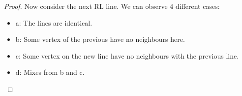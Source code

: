 \documentclass[12pt]{article}
\theoremstyle{definition}
\theoremstyle{remark}
\begin{document}
\begin{proof}
    Now consider the next RL line. We can observe 4 different cases:
    \begin{itemize}
        \item a: The lines are identical.
        \item b: Some vertex of the previous have no neighbours here.
        \item c: Some vertex on the new line have no neighbours with the previous line.
        \item d: Mixes from b and c.
    \end{itemize}




\end{proof}
\end{document}

